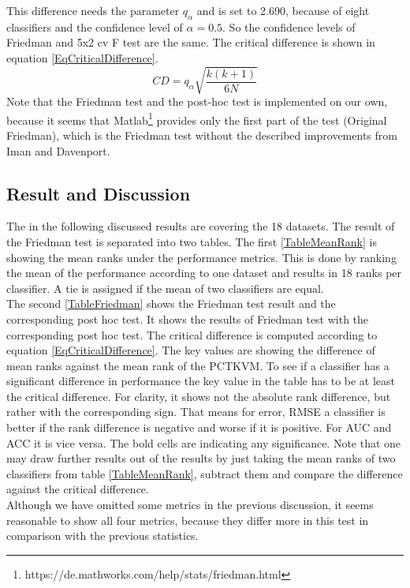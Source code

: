 This difference needs the parameter $q_\alpha$ and is set to 2.690, because of eight classifiers and the confidence level of $\alpha = 0.5$.
So the confidence levels of Friedman and 5x2 cv F test are the same.
The critical difference is shown in equation \eqref{EqCriticalDifference}.\cite[p. 11-12]{JanezDemsar.2006}
\begin{equation}\label{EqCriticalDifference}
	CD = q_\alpha\sqrt{\frac{k(k+1)}{6N}}
\end{equation}
Note that the Friedman test and the post-hoc test is implemented on our own, because it seems that Matlab\footnote{https://de.mathworks.com/help/stats/friedman.html} provides only the first part of the test (Original Friedman), which is the Friedman test without the described improvements from Iman and Davenport.

\subsection{Result and Discussion}\label{EmSubSecResMulDa}
The in the following discussed results are covering the 18 datasets.
The result of the Friedman test is separated into two tables.
The first \ref{TableMeanRank} is showing the mean ranks under the performance metrics.
This is done by ranking the mean of the performance according to one dataset and results in 18 ranks per classifier. A tie is assigned if the mean of two classifiers are equal.\\
The second \ref{TableFriedman} shows the Friedman test result and the corresponding post hoc test. 
It shows the results of Friedman test with the corresponding post hoc test. The critical difference is computed according to equation \eqref{EqCriticalDifference}.
The key values are showing the difference of mean ranks against the mean rank of the \acs{PCTKVM}.
To see if a classifier has a significant difference in performance the key value in the table has to be at least the critical difference.
For clarity, it shows not the absolute rank difference, but rather with the corresponding sign.
That means for error, \acs{RMSE} a classifier is better if the rank difference is negative and worse if it is positive.
For \acs{AUC} and \acs{ACC} it is vice versa.
The bold cells are indicating any significance.
Note that one may draw further results out of the results by just taking the mean ranks of two classifiers from table \ref{TableMeanRank}, subtract them and compare the difference against the critical difference. \\
Although we have omitted some metrics in the previous discussion, it seems reasonable to show all four metrics, because they differ more in this test in comparison with the previous statistics.
